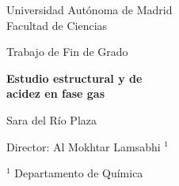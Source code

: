 \begin{titlepage}
        \begin{center}
            \vspace*{5mm}
            \large \textsf{ Universidad Autónoma de Madrid\\
            Facultad de Ciencias}
            \vspace*{3.5cm}
        
            Trabajo de Fin de Grado 
        
            \vspace{3cm}
        
            \Large\textbf{Estudio estructural y de \\ acidez en fase gas} %
        
            \vspace{2cm}
        
            \large Sara del Río Plaza %
        
            \vfill
        
            \normalsize Director: Al Mokhtar Lamsabhi $^{1}$ \\%
            
        
            \vspace{1cm}
        
            $^{1}$ Departamento de Química\\ %
     
        
        \end{center}
    \end{titlepage}